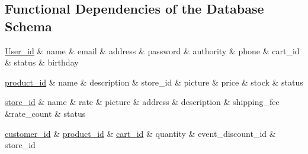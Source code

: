 \documentclass[a4paper, 12pt]{article}
\begin{document}
\subsection{Functional Dependencies of the Database Schema}

\newline
\begin{dependency}
    \begin{deptext}[TxtBook] %
        \underline{User_id} \& name \& email \& address \& password \& authority \& phone \& cart_id \& status \& birthday \\
    \end{deptext}
\end{dependency}

\newline
\begin{dependency}
    \begin{deptext}[TxtBook] %
        \underline{product_id} \& name \& description \& store_id \& picture \& price \& stock \& status \\
    \end{deptext}
\end{dependency}

\newline
\begin{dependency}
    \begin{deptext}[TxtBook] %
        \underline{store_id} \& name \& rate \& picture \& address \& description \& shipping_fee \&rate_count \& status \\
    \end{deptext}
\end{dependency}

\newline
\begin{dependency}
    \begin{deptext}[TxtBook] %
        \underline{customer_id} \& \underline{product_id} \& \underline{cart_id} \& quantity \& event_discount_id \& store_id \\
    \end{deptext}
\end{dependency}
\end{document}

